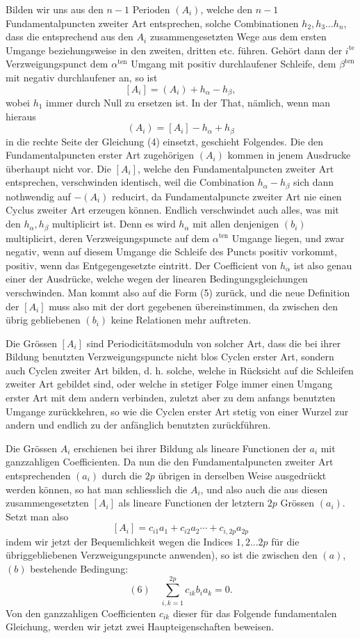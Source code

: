\documentclass[10pt]{article}
\begin{document}
Bilden wir uns aus den \(n-1\) Perioden \((A_i)\), welche den \(n-1\) Fundamentalpuncten zweiter Art entsprechen, solche Combinationen \(h_2,h_3\ldots h_n\), dass die entsprechend aus den \(A_i\) zusammengesetzten Wege aus dem ersten Umgange beziehungsweise in den zweiten, dritten etc. führen. Gehört dann der \(i^{\text{te}}\) Verzweigungspunct dem \(\alpha^{\text{ten}}\) Umgang mit positiv durchlaufener Schleife, dem \(\beta^{\text{ten}}\) mit negativ durchlaufener an, so ist
\[
{}[A_i]=(A_i)+h_{\alpha}-h_{\beta},
\]
wobei \(h_1\) immer durch Null zu ersetzen ist. In der That, nämlich, wenn man hieraus
\[
(A_i)=[A_i]-h_{\alpha}+h_{\beta}
\]
in die rechte Seite der Gleichung (4) einsetzt, geschieht Folgendes. Die den Fundamentalpuncten erster Art zugehörigen \((A_i)\) kommen in jenem Ausdrucke überhaupt nicht vor. Die \([A_i]\), welche den Fundamentalpuncten zweiter Art entsprechen, verschwinden identisch, weil die Combination \(h_{\alpha}-h_{\beta}\) sich dann nothwendig auf \(-(A_i)\) reducirt, da Fundamentalpuncte zweiter Art nie einen Cyclus zweiter Art erzeugen können. Endlich verschwindet auch alles, was mit den \(h_{\alpha},h_{\beta}\) multiplicirt ist. Denn es wird \(h_{\alpha}\) mit allen denjenigen \((b_i)\) multiplicirt, deren Verzweigungspuncte auf dem \(\alpha^{\text{ten}}\) Umgange liegen, und zwar negativ, wenn auf diesem Umgange die Schleife des Puncts positiv vorkommt, positiv, wenn das Entgegengesetzte eintritt. Der Coefficient von \(h_{\alpha}\) ist also genau einer der Ausdrücke, welche wegen der linearen Bedingungsgleichungen verschwinden. Man kommt also auf die Form (5) zurück, und die neue Definition der \([A_i]\) muss also mit der dort gegebenen übereinstimmen, da zwischen den übrig gebliebenen \((b_i)\) keine Relationen mehr auftreten.

Die Grössen \([A_i]\) sind Periodicitätsmoduln von solcher Art, dass die bei ihrer Bildung benutzten Verzweigungspuncte nicht blos Cyclen erster Art, sondern auch Cyclen zweiter Art bilden, d. h. solche, welche in Rücksicht auf die Schleifen zweiter Art gebildet sind, oder welche in stetiger Folge immer einen Umgang erster Art mit dem andern verbinden, zuletzt aber zu dem anfangs benutzten Umgange zurückkehren, so wie die Cyclen erster Art stetig von einer Wurzel zur andern und endlich zu der anfänglich benutzten zurückführen.

Die Grössen \(A_i\) erschienen bei ihrer Bildung als lineare Functionen der \(a_i\) mit ganzzahligen Coefficienten. Da nun die den Fundamentalpuncten zweiter Art entsprechenden \((a_i)\) durch die \(2p\) übrigen in derselben Weise ausgedrückt werden können, so hat man schliesslich die \(A_i\), und also auch die aus diesen zusammengesetzten \([A_i]\) als lineare Functionen der letztern \(2p\) Grössen \((a_i)\). Setzt man also
\[
{}[A_i]=c_{i1}a_1+c_{i2}a_2\cdots+c_{i,2p}a_{2p}
\]
indem wir jetzt der Bequemlichkeit wegen die Indices \(1,2\ldots2p\) für die übriggebliebenen Verzweigungspuncte anwenden), so ist die zwischen den \((a)\), \((b)\) bestehende Bedingung:
\[
(6)\quad \sum_{i,k=1}^{2p} c_{ik}b_i a_k=0.
\]
Von den ganzzahligen Coefficienten \(c_{ik}\) dieser für das Folgende fundamentalen Gleichung, werden wir jetzt zwei Haupteigenschaften beweisen.
\end{document}
